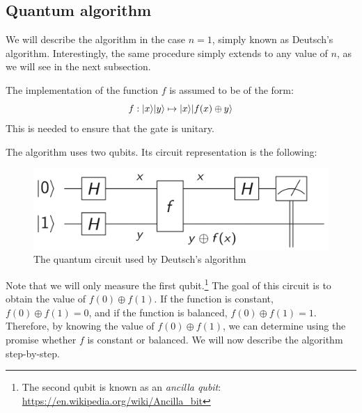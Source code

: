 \documentclass[12pt,a4paper]{article}
\theoremstyle{plain}
\theoremstyle{definition}
\DeclarePairedDelimiter\ket{\lvert}{\rangle}
\begin{document}
\subsection{Quantum algorithm}
We will describe the algorithm in the case $n=1$, simply known as Deutsch's algorithm. Interestingly, the same procedure simply extends to any value of $n$, as we will see in the next subsection. 

The implementation of the function $f$ is assumed to be of the form:
\begin{equation*}
    f : \ket{x}\ket{y} \mapsto \ket{x}\ket{f(x)\oplus y}
\end{equation*}
This is needed to ensure that the gate is unitary.

The algorithm uses two qubits. Its circuit representation is the following:
\begin{figure}[!ht]
    \centering
    \includegraphics*[scale=0.4]{deutsch-circuit.png}
    \caption{The quantum circuit used by Deutsch's algorithm}
\end{figure}

Note that we will only measure the first qubit.\footnote{The second qubit is known as an \emph{ancilla qubit}: \url{https://en.wikipedia.org/wiki/Ancilla_bit}} The goal of this circuit is to obtain the value of $f(0)\oplus f(1)$. If the function is constant, $f(0)\oplus f(1) = 0$, and if the function is balanced, $f(0)\oplus f(1) = 1$. Therefore, by knowing the value of $f(0)\oplus f(1)$, we can determine using the promise whether $f$ is constant or balanced. We will now describe the algorithm step-by-step.
\end{document}
